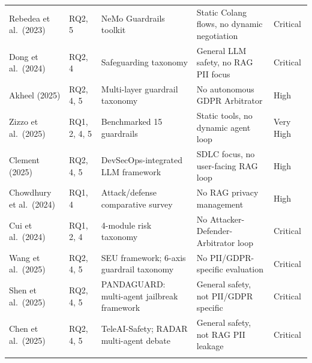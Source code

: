 \documentclass[12pt, a4paper]{report}
\begin{document}
\begin{small}
\begin{longtable}{L{3cm} C{1.2cm} L{3.5cm} L{3.5cm} C{1.5cm}}
Rebedea et al.\ (2023) & RQ2, 5 & NeMo Guardrails toolkit & Static Colang flows, no dynamic negotiation & Critical \\
Dong et al.\ (2024) & RQ2, 4 & Safeguarding taxonomy & General LLM safety, no RAG PII focus & Critical \\
Akheel (2025) & RQ2, 4, 5 & Multi-layer guardrail taxonomy & No autonomous GDPR Arbitrator & High \\
Zizzo et al.\ (2025) & RQ1, 2, 4, 5 & Benchmarked 15 guardrails & Static tools, no dynamic agent loop & Very High \\
Clement (2025) & RQ2, 4, 5 & DevSecOps-integrated LLM framework & SDLC focus, no user-facing RAG loop & High \\
Chowdhury et al.\ (2024) & RQ1, 4 & Attack/defense comparative survey & No RAG privacy management & High \\
Cui et al.\ (2024) & RQ1, 2, 4 & 4-module risk taxonomy & No Attacker-Defender-Arbitrator loop & Critical \\
Wang et al.\ (2025) & RQ2, 4, 5 & SEU framework; 6-axis guardrail taxonomy & No PII/GDPR-specific evaluation & Critical \\
Shen et al.\ (2025) & RQ2, 4, 5 & PANDAGUARD: multi-agent jailbreak framework & General safety, not PII/GDPR specific & Critical \\
Chen et al.\ (2025) & RQ2, 4, 5 & TeleAI-Safety; RADAR multi-agent debate & General safety, not RAG PII leakage & Critical \\

\midrule
{}
 \\
\midrule


\end{longtable}
\end{small}
\end{document}
